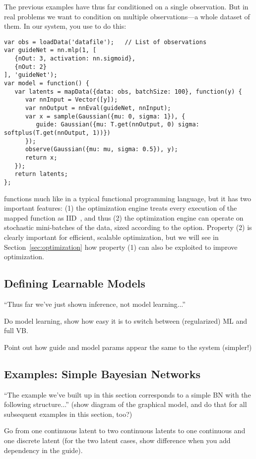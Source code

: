The previous examples have thus far conditioned on a single observation. But in real problems we want to condition on multiple observations---a whole dataset of them.
In our system, you use  to do this:
\begin{lstlisting}
var obs = loadData('datafile');   // List of observations
var guideNet = nn.mlp(1, [
   {nOut: 3, activation: nn.sigmoid},
   {nOut: 2}
], 'guideNet');
var model = function() {
   var latents = mapData({data: obs, batchSize: 100}, function(y) {
      var nnInput = Vector([y]);
      var nnOutput = nnEval(guideNet, nnInput);
      var x = sample(Gaussian({mu: 0, sigma: 1}), {
         guide: Gaussian({mu: T.get(nnOutput, 0) sigma: softplus(T.get(nnOutput, 1))})
      });
      observe(Gaussian({mu: mu, sigma: 0.5}), y);
      return x;
   });
   return latents;
};
\end{lstlisting}
 functions much like  in a typical functional programming language, but it has two important features: (1) the optimization engine treats every execution of the mapped function as IID~, and thus (2) the optimization engine can operate on stochastic mini-batches of the data, sized according to the  option.
Property (2) is clearly important for efficient, scalable optimization, but we will see in Section~\ref{sec:optimization} how property (1) can also be exploited to improve optimization.


\subsection{Defining Learnable Models}

``Thus far we've just shown inference, not model learning...''

Do model learning, show how easy it is to switch between (regularized) ML and full VB.

Point out how guide and model params appear the same to the system (simpler!)


\subsection{Examples: Simple Bayesian Networks}

``The example we've built up in this section corresponds to a simple BN with the following structure...'' (show diagram of the graphical model, and do that for all subsequent examples in this section, too?)

Go from one continuous latent to two continuous latents to one continuous and one discrete latent (for the two latent cases, show difference when you add dependency in the guide).

